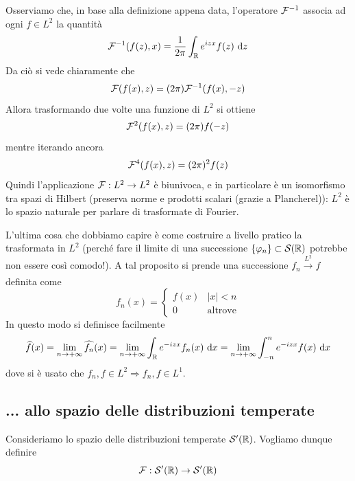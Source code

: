 Osserviamo che, in base alla definizione appena data, l'operatore $\mathcal{F}^{-1}$ associa ad ogni $f\in L^2$ la quantità
\begin{equation*}
\mathcal{F}^{-1}(f(z),x)=\frac{1}{2\pi}\int_{\mathbb{R}} e^{izx}f(z)\  \mathrm{d} z
\end{equation*}
Da ciò si vede chiaramente che
\begin{equation*}
\mathcal{F}(f(x),z)=(2\pi)\mathcal{F}^{-1}(f(x),-z)
\end{equation*}
Allora trasformando due volte una funzione di $L^2$ si ottiene
\begin{equation*}
\mathcal{F}^2(f(x),z)=(2\pi)f(-z)
\end{equation*}
mentre iterando ancora
\begin{equation*}
\mathcal{F}^4(f(x),z)=(2\pi)^2f(z)
\end{equation*}
Quindi l'applicazione $\mathcal{F}: L^2\to L^2$ è biunivoca, e in particolare è un isomorfismo tra spazi di Hilbert (preserva norme e prodotti scalari (grazie a Plancherel)): $L^2$ è lo spazio naturale per parlare di trasformate di Fourier.

L'ultima cosa che dobbiamo capire è come costruire a livello pratico la trasformata in $L^2$ (perché fare il limite di una successione $\{\varphi_n\}\subset\mathcal{S}(\mathbb{R})$ potrebbe non essere così comodo!). A tal proposito si prende una successione $f_n\xrightarrow[]{L^2}f$ definita come
\begin{equation*}
f_n(x)=
\begin{cases}
f(x)&|x|<n\\
0&\text{altrove}
\end{cases}
\end{equation*}
In questo modo si definisce facilmente
\begin{equation*}
\widehat{f}(x)=\lim_{n\to+\infty} \widehat{f_n}(x)=\lim_{n\to+\infty} \int_{\mathbb{R}} e^{-izx}f_n(x)\  \mathrm{d} x=\lim_{n\to+\infty} \int_{-n}^n e^{-izx}f(x)\  \mathrm{d} x
\end{equation*}
dove si è usato che $f_n,f\in L^2\Rightarrow f_n,f\in L^1$.


\subsection{... allo spazio delle distribuzioni temperate}

Consideriamo lo spazio delle distribuzioni temperate $\mathcal{S}'(\mathbb{R})$. Vogliamo dunque definire 
\begin{equation*}
\mathcal{F}:\mathcal{S}'(\mathbb{R})\to\mathcal{S}'(\mathbb{R})
\end{equation*}

